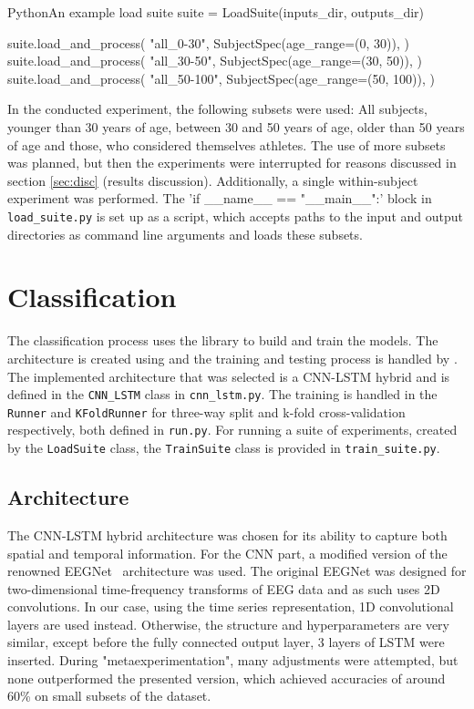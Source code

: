 \documentclass[english, he, bc, kiv, iso690alph, viewonly]{fasthesis}
\begin{document}
\begin{code}{Python}{An example load suite\label{lst:loadsuite}}
	suite = LoadSuite(inputs_dir, outputs_dir)

	suite.load_and_process(
	"all_0-30",
	SubjectSpec(age_range=(0, 30)),
	)
	suite.load_and_process(
	"all_30-50",
	SubjectSpec(age_range=(30, 50)),
	)
	suite.load_and_process(
	"all_50-100",
	SubjectSpec(age_range=(50, 100)),
	)
\end{code}

In the conducted experiment, the following subsets were used: All subjects, younger than 30 years of age, between 30 and 50 years of age, older than 50 years of age and those, who considered themselves athletes. The use of more subsets was planned, but then the experiments were interrupted for reasons discussed in section \ref{sec:disc} (results discussion). Additionally, a single within-subject experiment was performed. The \command'if __name__ == "__main__":' block in \texttt{load\_suite.py} is set up as a script, which accepts paths to the input and output directories as command line arguments and loads these subsets.

\section{Classification}
\label{sec:classification}

The classification process uses the  library to build and train the models. The architecture is created using  and the training and testing process is handled by . The implemented architecture that was selected is a CNN-LSTM hybrid and is defined in the \texttt{CNN\_LSTM} class in \texttt{cnn\_lstm.py}. The training is handled in the \texttt{Runner} and \texttt{KFoldRunner} for three-way split and k-fold cross-validation respectively, both defined in \texttt{run.py}. For running a suite of experiments, created by the \texttt{LoadSuite} class, the \texttt{TrainSuite} class is provided in \texttt{train\_suite.py}.

\subsection{Architecture}

The CNN-LSTM hybrid architecture was chosen for its ability to capture both spatial and temporal information. For the CNN part, a modified version of the renowned EEGNet~\cite{lawhern:eegnet:18} architecture was used. The original EEGNet was designed for two-dimensional time-frequency transforms of EEG data and as such uses 2D convolutions. In our case, using the time series representation, 1D convolutional layers are used instead. Otherwise, the structure and hyperparameters are very similar, except before the fully connected output layer, 3 layers of LSTM were inserted. During "metaexperimentation", many adjustments were attempted, but none outperformed the presented version, which achieved accuracies of around 60\% on small subsets of the dataset.
\end{document}
